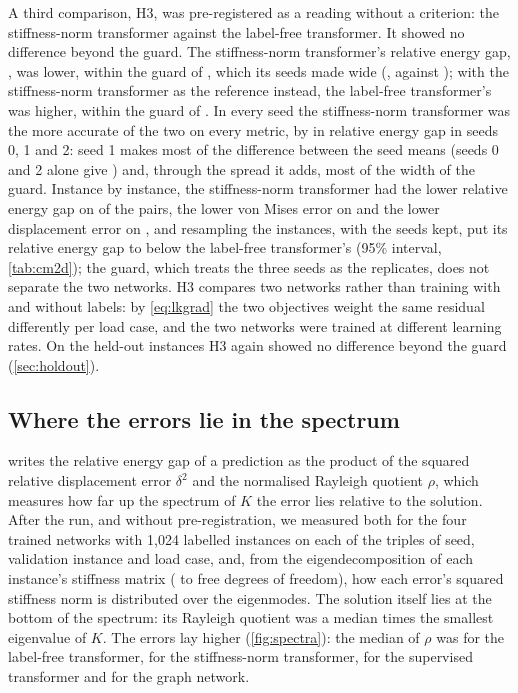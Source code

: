 A third comparison, H3, was pre-registered as a reading without a criterion: the
stiffness-norm transformer against the label-free transformer. It showed no difference
beyond the guard. The stiffness-norm transformer's relative energy gap, \numCmKnormGap{},
was \numHThreeRel{} lower, within the guard of \numHThreeTau{}, which its seeds made wide
(\numCmKnormGapSeeds{}, against \numCmFreeGapSeeds{}); with the stiffness-norm transformer
as the reference instead, the label-free transformer's was \numHThreeExRel{} higher, within
the guard of \numHThreeExTau{}. In every seed the stiffness-norm transformer was the more
accurate of the two on every metric, by \numHThreeSeedRel{} in relative energy gap in seeds
0, 1 and 2: seed 1 makes most of the difference between the seed means (seeds 0 and 2 alone
give \numHThreeSeedsZeroTwo{}) and, through the spread it adds, most of the width of the
guard. Instance by instance, the stiffness-norm transformer had the lower relative energy
gap on \numPairCmKnormFreeGap{} of the pairs, the lower von Mises error on
\numPairCmKnormFreeVm{} and the lower displacement error on \numPairCmKnormFreeDisp{}, and
resampling the instances, with the seeds kept, put its relative energy gap
\numHThreeResLow{} to \numHThreeResHigh{} below the label-free transformer's (95\% interval,
\cref{tab:cm2d}); the guard, which treats the three seeds as the replicates, does not
separate the two networks. H3 compares two networks rather than training with and without
labels: by \eqref{eq:lkgrad} the two objectives weight the same residual differently per
load case, and the two networks were trained at different learning rates. On the held-out
instances H3 again showed no difference beyond the guard (\cref{sec:holdout}).

\subsection{Where the errors lie in the spectrum}\label{sec:results2d:spectrum}

 writes the relative energy gap of a prediction as the product of the
squared relative displacement error $\delta^2$ and the normalised Rayleigh quotient $\rho$,
which measures how far up the spectrum of $K$ the error lies relative to the solution. After
the run, and without pre-registration, we measured both for the four trained networks with
1,024 labelled instances on each of the \numSpecLoads{} triples of seed, validation instance
and load case, and, from the eigendecomposition of each instance's stiffness matrix
(\numSpecFreeMin{} to \numSpecFreeMax{} free degrees of freedom), how each error's squared
stiffness norm is distributed over the eigenmodes. The solution itself lies at the bottom of
the spectrum: its Rayleigh quotient was a median \numSpecRqStarOverMin{} times the smallest
eigenvalue of $K$. The errors lay higher (\cref{fig:spectra}): the median of $\rho$ was
\numSpecRqFree{} for the label-free transformer, \numSpecRqKnorm{} for the stiffness-norm
transformer, \numSpecRqLab{} for the supervised transformer and \numSpecRqMgn{} for the
graph network.

